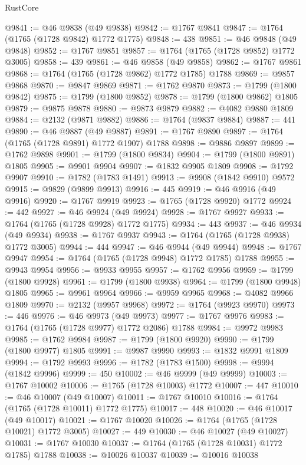 \begin{lexlean}{RustCore}
\begin{coremodule}
@9841 := @46 @9838 (@49 @9838)
@9842 := @1767 @9841
@9847 := @1764 (@1765 (@1728 @9842) @1772 @1775)
@9848 := 438
@9851 := @46 @9848 (@49 @9848)
@9852 := @1767 @9851
@9857 := @1764 (@1765 (@1728 @9852) @1772 @3005)
@9858 := 439
@9861 := @46 @9858 (@49 @9858)
@9862 := @1767 @9861
@9868 := @1764 (@1765 (@1728 @9862) @1772 @1785) @1788
@9869 := @9857 @9868
@9870 := @9847 @9869
@9871 := @1762 @9870
@9873 := @1799 (@1800 @9842)
@9875 := @1799 (@1800 @9852)
@9878 := @1799 (@1800 @9862) @1805
@9879 := @9875 @9878
@9880 := @9873 @9879
@9882 := @4082 @9880 @1809
@9884 := @2132 (@9871 @9882)
@9886 := @1764 (@9837 @9884)
@9887 := 441
@9890 := @46 @9887 (@49 @9887)
@9891 := @1767 @9890
@9897 := @1764 (@1765 (@1728 @9891) @1772 @1907) @1788
@9898 := @9886 @9897
@9899 := @1762 @9898
@9901 := @1799 (@1800 @9834)
@9904 := @1799 (@1800 @9891) @1805
@9905 := @9901 @9904
@9907 := @1832 @9905 @1809
@9908 := @1792 @9907
@9910 := @1782 (@1783 @1491)
@9913 := @9908 (@1842 @9910) @9572
@9915 := @9829 (@9899 @9913)
@9916 := 445
@9919 := @46 @9916 (@49 @9916)
@9920 := @1767 @9919
@9923 := @1765 (@1728 @9920) @1772
@9924 := 442
@9927 := @46 @9924 (@49 @9924)
@9928 := @1767 @9927
@9933 := @1764 (@1765 (@1728 @9928) @1772 @1775)
@9934 := 443
@9937 := @46 @9934 (@49 @9934)
@9938 := @1767 @9937
@9943 := @1764 (@1765 (@1728 @9938) @1772 @3005)
@9944 := 444
@9947 := @46 @9944 (@49 @9944)
@9948 := @1767 @9947
@9954 := @1764 (@1765 (@1728 @9948) @1772 @1785) @1788
@9955 := @9943 @9954
@9956 := @9933 @9955
@9957 := @1762 @9956
@9959 := @1799 (@1800 @9928)
@9961 := @1799 (@1800 @9938)
@9964 := @1799 (@1800 @9948) @1805
@9965 := @9961 @9964
@9966 := @9959 @9965
@9968 := @4082 @9966 @1809
@9970 := @2132 (@9957 @9968)
@9972 := @1764 (@9923 @9970)
@9973 := 446
@9976 := @46 @9973 (@49 @9973)
@9977 := @1767 @9976
@9983 := @1764 (@1765 (@1728 @9977) @1772 @2086) @1788
@9984 := @9972 @9983
@9985 := @1762 @9984
@9987 := @1799 (@1800 @9920)
@9990 := @1799 (@1800 @9977) @1805
@9991 := @9987 @9990
@9993 := @1832 @9991 @1809
@9994 := @1792 @9993
@9996 := @1782 (@1783 @1500)
@9998 := @9994 (@1842 @9996)
@9999 := 450
@10002 := @46 @9999 (@49 @9999)
@10003 := @1767 @10002
@10006 := @1765 (@1728 @10003) @1772
@10007 := 447
@10010 := @46 @10007 (@49 @10007)
@10011 := @1767 @10010
@10016 := @1764 (@1765 (@1728 @10011) @1772 @1775)
@10017 := 448
@10020 := @46 @10017 (@49 @10017)
@10021 := @1767 @10020
@10026 := @1764 (@1765 (@1728 @10021) @1772 @3005)
@10027 := 449
@10030 := @46 @10027 (@49 @10027)
@10031 := @1767 @10030
@10037 := @1764 (@1765 (@1728 @10031) @1772 @1785) @1788
@10038 := @10026 @10037
@10039 := @10016 @10038

\end{coremodule}
\end{lexlean}
